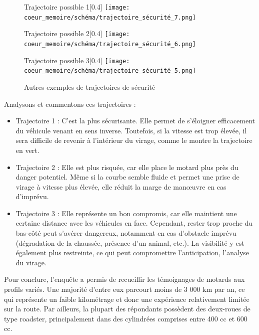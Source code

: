 \begin{figure}[H]
  \centering
  \begin{subcaptionbox}{Trajectoire possible 1}[0.4\linewidth]
    {\texttt{[image: coeur\_memoire/schéma/trajectoire\_sécurité\_7.png]}}
  \end{subcaptionbox}
  \hfill
  \begin{subcaptionbox}{Trajectoire possible 2}[0.4\linewidth]
    {\texttt{[image: coeur\_memoire/schéma/trajectoire\_sécurité\_6.png]}}
  \end{subcaptionbox}
  
  \vspace{0.5cm}
  
  \begin{subcaptionbox}{Trajectoire possible 3}[0.4\linewidth]
    {\texttt{[image: coeur\_memoire/schéma/trajectoire\_sécurité\_5.png]}}

  \end{subcaptionbox}

  \caption{Autres exemples de trajectoires de sécurité}
\end{figure}

Analysons et commentons ces trajectoires :
\begin{itemize}
    \item Trajectoire 1 : C’est la plus sécurisante. Elle permet de s’éloigner efficacement du véhicule venant en sens inverse. Toutefois, si la vitesse est trop élevée, il sera difficile de revenir à l’intérieur du virage, comme le montre la trajectoire en vert.
    \item Trajectoire 2 : Elle est plus risquée, car elle place le motard plus près du danger potentiel. Même si la courbe semble fluide et permet une prise de virage à vitesse plus élevée, elle réduit la marge de manœuvre en cas d’imprévu.
    \item Trajectoire 3 : Elle représente un bon compromis, car elle maintient une certaine distance avec les véhicules en face. Cependant, rester trop proche du bas-côté peut s’avérer dangereux, notamment en cas d’obstacle imprévu (dégradation de la chaussée, présence d’un animal, etc.). La visibilité y est également plus restreinte, ce qui peut compromettre l’anticipation, l'analyse du virage.
\end{itemize}
Pour conclure, l’enquête a permis de recueillir les témoignages de motards aux profils variés. Une majorité d’entre eux parcourt moins de 3 000 km par an, ce qui représente un faible kilométrage et donc une expérience relativement limitée sur la route. Par ailleurs, la plupart des répondants possèdent des deux-roues de type roadster, principalement dans des cylindrées comprises entre 400 cc et 600 cc.

